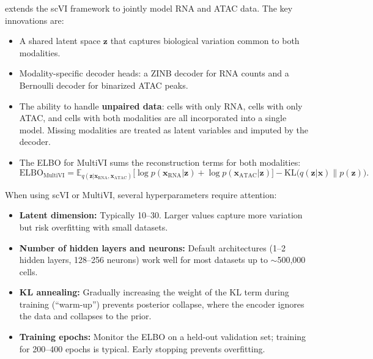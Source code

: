  extends the scVI framework to jointly model RNA and ATAC data. The key innovations are:
\begin{itemize}[itemsep=2pt]
  \item A shared latent space $\mathbf{z}$ that captures biological variation common to both modalities.
  \item Modality-specific decoder heads: a ZINB decoder for RNA counts and a Bernoulli decoder for binarized ATAC peaks.
  \item The ability to handle \textbf{unpaired data}: cells with only RNA, cells with only ATAC, and cells with both modalities are all incorporated into a single model. Missing modalities are treated as latent variables and imputed by the decoder.
  \item The ELBO for MultiVI sums the reconstruction terms for both modalities:
  \begin{equation}
    \text{ELBO}_{\text{MultiVI}} = \mathbb{E}_{q(\mathbf{z}|\mathbf{x}_{\text{RNA}}, \mathbf{x}_{\text{ATAC}})}\bigl[\log p(\mathbf{x}_{\text{RNA}} | \mathbf{z}) + \log p(\mathbf{x}_{\text{ATAC}} | \mathbf{z})\bigr] - \text{KL}\bigl(q(\mathbf{z}|\mathbf{x}) \| p(\mathbf{z})\bigr).
    \label{eq:multiomics:multivi-elbo}
  \end{equation}
\end{itemize}

\begin{tipbox}[title={Practical Considerations for VAE-Based Models}]
When using scVI or MultiVI, several hyperparameters require attention:
\begin{itemize}[itemsep=2pt]
  \item \textbf{Latent dimension:} Typically 10--30. Larger values capture more variation but risk overfitting with small datasets.
  \item \textbf{Number of hidden layers and neurons:} Default architectures (1--2 hidden layers, 128--256 neurons) work well for most datasets up to $\sim$500{,}000 cells.
  \item \textbf{KL annealing:} Gradually increasing the weight of the KL term during training (``warm-up'') prevents posterior collapse, where the encoder ignores the data and collapses to the prior.
  \item \textbf{Training epochs:} Monitor the ELBO on a held-out validation set; training for 200--400 epochs is typical. Early stopping prevents overfitting.
\end{itemize}
\end{tipbox}

